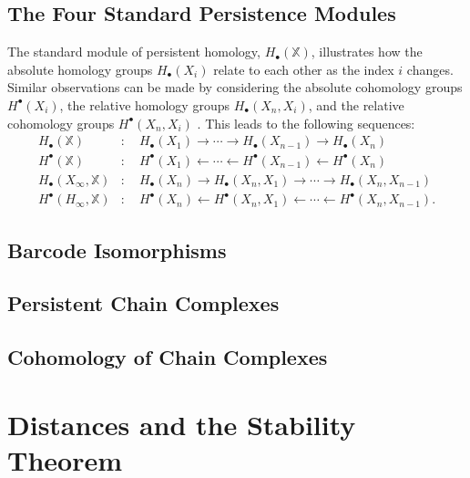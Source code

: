 \subsection{The Four Standard Persistence Modules}
\label{standardpersistencemodules}
The standard module of persistent homology, \( H_\bullet(\mathbb{X}) \), illustrates how the absolute homology groups \( H_\bullet(X_i) \) relate to each other as the index \( i \) changes. Similar observations can be made by considering the absolute cohomology groups \( H^\bullet(X_i) \), the relative homology groups \( H_\bullet(X_n, X_i) \), and the relative cohomology groups \( H^\bullet(X_n, X_i) \) \cite[§2.4]{de2011dualities}. This leads to the following sequences:
\begin{align*}
	H_\bullet(\mathbb{X}) &: \quad H_\bullet(X_1) \rightarrow \cdots \rightarrow H_\bullet(X_{n-1}) \rightarrow H_\bullet(X_n) \\
	H^\bullet(\mathbb{X}) &: \quad H^\bullet(X_1) \leftarrow \cdots \leftarrow H^\bullet(X_{n-1}) \leftarrow H^\bullet(X_n) \\
	H_\bullet(X_\infty, \mathbb{X})&: \quad H_\bullet(X_n) \rightarrow H_\bullet(X_n,X_1) \rightarrow \cdots \rightarrow H_\bullet(X_n,X_{n-1}) \\
	H^{\bullet}(H_\infty, \mathbb{X})&: \quad H^{\bullet}(X_n) \leftarrow H^{\bullet}(X_n,X_1) \leftarrow \cdots \leftarrow H^{\bullet}(X_n, X_{n-1}).
\end{align*}

\subsection{Barcode Isomorphisms}

\subsection{Persistent Chain Complexes}

\subsection{Cohomology of Chain Complexes}

\section{Distances and the Stability Theorem}

